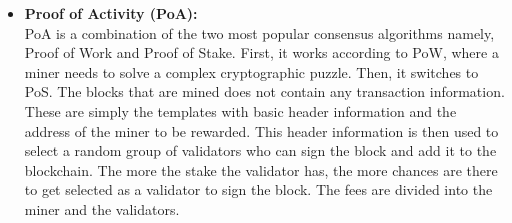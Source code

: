 \begin{itemize}
					\item \textbf{Proof of Activity (PoA):} \\
					PoA is a combination of the two most popular consensus algorithms namely, Proof of Work and Proof of Stake. First, it works according to PoW, where a miner needs to solve a complex cryptographic puzzle. Then, it switches to PoS. The blocks that are mined does not contain any transaction information. These are simply the templates with basic header information and the address of the miner to be rewarded. This header information is then used to select a random group of validators who can sign the block and add it to the blockchain. The more the stake the validator has, the more chances are there to get selected as a validator to sign the block. The fees are divided into the miner and the validators. 
				\end{itemize}
				

